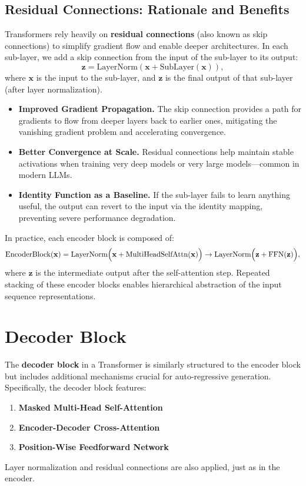 \subsection{Residual Connections: Rationale and Benefits}
\noindent
Transformers rely heavily on \textbf{residual connections} (also known as skip connections) to simplify gradient flow and enable deeper architectures. In each sub-layer, we add a skip connection from the input of the sub-layer to its output:
\[
\mathbf{z} = \text{LayerNorm}(\mathbf{x} + \text{SubLayer}(\mathbf{x})),
\]
where $\mathbf{x}$ is the input to the sub-layer, and $\mathbf{z}$ is the final output of that sub-layer (after layer normalization).

\begin{itemize}
    \item \textbf{Improved Gradient Propagation.} The skip connection provides a path for gradients to flow from deeper layers back to earlier ones, mitigating the vanishing gradient problem and accelerating convergence.
    \item \textbf{Better Convergence at Scale.} Residual connections help maintain stable activations when training very deep models or very large models—common in modern LLMs.
    \item \textbf{Identity Function as a Baseline.} If the sub-layer fails to learn anything useful, the output can revert to the input via the identity mapping, preventing severe performance degradation.
\end{itemize}

\noindent
In practice, each encoder block is composed of:
\[
\text{EncoderBlock}(\mathbf{x}) = 
\text{LayerNorm}\Bigl(\mathbf{x} + \text{MultiHeadSelfAttn}(\mathbf{x})\Bigr) 
\rightarrow 
\text{LayerNorm}\Bigl(\mathbf{z} + \text{FFN}(\mathbf{z})\Bigr),
\]
where $\mathbf{z}$ is the intermediate output after the self-attention step. Repeated stacking of these encoder blocks enables hierarchical abstraction of the input sequence representations.


\section{Decoder Block}
\label{sec:decoder_block}

\noindent
The \textbf{decoder block} in a Transformer is similarly structured to the encoder block but includes additional mechanisms crucial for auto-regressive generation. Specifically, the decoder block features:
\begin{enumerate}
    \item \textbf{Masked Multi-Head Self-Attention}
    \item \textbf{Encoder-Decoder Cross-Attention}
    \item \textbf{Position-Wise Feedforward Network}
\end{enumerate}
Layer normalization and residual connections are also applied, just as in the encoder.

